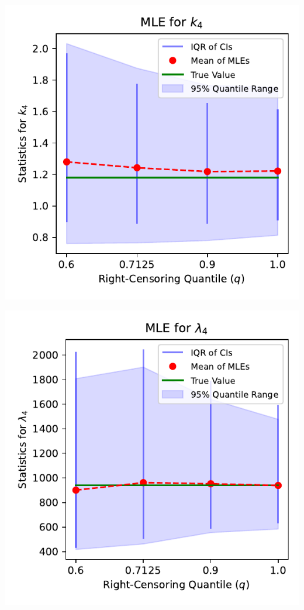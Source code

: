 \documentclass{article}
\begin{document}
\vspace{0.25mm}

\noindent
\begin{minipage}[t]{0.45\textwidth}
  \centering
  \includegraphics[width=\textwidth,height=0.33\textheight,keepaspectratio]{plot-q-vs-shape.4.pdf}
\end{minipage}%
\hspace{0.05\textwidth} %
\begin{minipage}[t]{0.45\textwidth}
  \centering
  \includegraphics[width=\textwidth,height=0.33\textheight,keepaspectratio]{plot-q-vs-scale.4.pdf}
\end{minipage}
\end{document}
